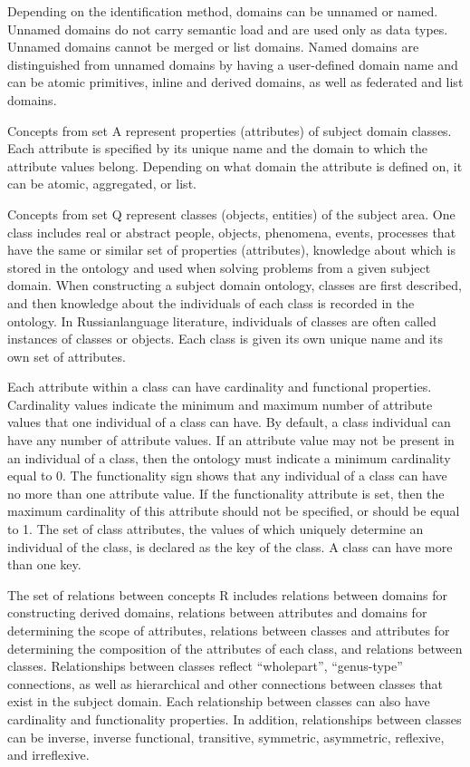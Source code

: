 \documentclass[10pt]{article}
\begin{document}
\begin{multicols}{2}
Depending on the identification method, domains can
be unnamed or named. Unnamed domains do not carry
semantic load and are used only as data types. Unnamed
domains cannot be merged or list domains. Named
domains are distinguished from unnamed domains by
having a user-defined domain name and can be atomic
primitives, inline and derived domains, as well as federated and list domains.

Concepts from set A represent properties (attributes)
of subject domain classes. Each attribute is specified by
its unique name and the domain to which the attribute
values belong. Depending on what domain the attribute
is defined on, it can be atomic, aggregated, or list.

Concepts from set Q represent classes (objects, entities) of the subject area. One class includes real or
abstract people, objects, phenomena, events, processes
that have the same or similar set of properties (attributes),
knowledge about which is stored in the ontology and used
when solving problems from a given subject domain.
When constructing a subject domain ontology, classes are
first described, and then knowledge about the individuals
of each class is recorded in the ontology. In Russianlanguage literature, individuals of classes are often called
instances of classes or objects. Each class is given its own
unique name and its own set of attributes.

Each attribute within a class can have cardinality
and functional properties. Cardinality values indicate the
minimum and maximum number of attribute values that
one individual of a class can have. By default, a class
individual can have any number of attribute values. If
an attribute value may not be present in an individual
of a class, then the ontology must indicate a minimum
cardinality equal to 0. The functionality sign shows that
any individual of a class can have no more than one
attribute value. If the functionality attribute is set, then
the maximum cardinality of this attribute should not
be specified, or should be equal to 1. The set of class
attributes, the values of which uniquely determine an
individual of the class, is declared as the key of the class.
A class can have more than one key.

The set of relations between concepts R includes
relations between domains for constructing derived domains, relations between attributes and domains for
determining the scope of attributes, relations between
classes and attributes for determining the composition
of the attributes of each class, and relations between
classes. Relationships between classes reflect “wholepart”, “genus-type” connections, as well as hierarchical
and other connections between classes that exist in the
subject domain. Each relationship between classes can
also have cardinality and functionality properties. In
addition, relationships between classes can be inverse,
inverse functional, transitive, symmetric, asymmetric,
reflexive, and irreflexive.


\end{multicols}
\end{document}
